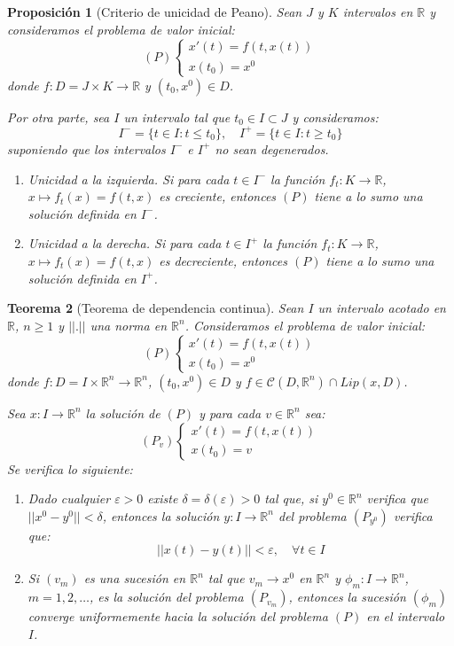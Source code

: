 \documentclass{report}
\newtheorem{theorem}{Teorema}[chapter]
\newtheorem{proposition}[theorem]{Proposición}
\theoremstyle{remark}
\theoremstyle{remark}
\theoremstyle{remark}
\theoremstyle{definition}
\theoremstyle{definition}
\theoremstyle{definition}
\begin{document}
\begin{proposition}[Criterio de unicidad de Peano]
    Sean $J$ y $K$ intervalos en $\mathbb{R}$ y consideramos el problema de valor inicial:
    $$(P) \begin{cases}
            x'(t) = f(t, x(t)) \\
            x(t_0) = x^0
        \end{cases}$$
    donde $f: D = J \times K \to \mathbb{R}$ y $(t_0, x^0) \in D$.

    Por otra parte, sea $I$ un intervalo tal que $t_0 \in I \subset J$ y consideramos:
    $$I^- = \{t \in I: t \leq t_0\}, \quad I^+ = \{t \in I: t \geq t_0\}$$
    suponiendo que los intervalos $I^-$ e $I^+$ no sean degenerados.
    \begin{enumerate}
        \item Unicidad a la izquierda. Si para cada $t \in I^-$ la función $f_t: K \to \mathbb{R}$, $x \mapsto f_t(x) = f(t, x)$ es creciente, entonces $(P)$ tiene a lo sumo una solución definida en $I^-$.
        \item Unicidad a la derecha. Si para cada $t \in I^+$ la función $f_t: K \to \mathbb{R}$, $x \mapsto f_t(x) = f(t, x)$ es decreciente, entonces $(P)$ tiene a lo sumo una solución definida en $I^+$.
    \end{enumerate}
\end{proposition}

\begin{theorem}[Teorema de dependencia continua]
    Sean $I$ un intervalo acotado en $\mathbb{R}$, $n \geq 1$ y $||.||$ una norma en $\mathbb{R}^n$.
    Consideramos el problema de valor inicial:
    $$(P) \begin{cases}
            x'(t) = f(t, x(t)) \\
            x(t_0) = x^0
        \end{cases}$$
    donde $f: D = I \times \mathbb{R}^n \to \mathbb{R}^n$, $(t_0, x^0) \in D$ y $f \in \mathcal{C}(D, \mathbb{R}^n) \cap Lip(x, D)$.

    Sea $x: I \to \mathbb{R}^n$ la solución de $(P)$ y para cada $v \in \mathbb{R}^n$ sea:
    $$(P_v) \begin{cases}
            x'(t) = f(t, x(t)) \\
            x(t_0) = v
        \end{cases}$$
    Se verifica lo siguiente:
    \begin{enumerate}
        \item Dado cualquier $\varepsilon > 0$ existe $\delta = \delta(\varepsilon) > 0$ tal que, si $y^0 \in \mathbb{R}^n$ verifica que $||x^0 - y^0|| < \delta$, entonces la solución $y: I \to \mathbb{R}^n$ del problema $(P_{y^0})$ verifica que:
              $$||x(t) - y(t)|| < \varepsilon, \quad \forall t \in I$$
        \item Si $(v_m)$ es una sucesión en $\mathbb{R}^n$ tal que $v_m \to x^0$ en $\mathbb{R}^n$ y $\phi_m: I \to \mathbb{R}^n$, $m = 1, 2, \dots$, es la solución del problema $(P_{v_m})$, entonces la sucesión $(\phi_m)$ converge uniformemente hacia la solución del problema $(P)$ en el intervalo $I$.
    \end{enumerate}
\end{theorem}
\end{document}
